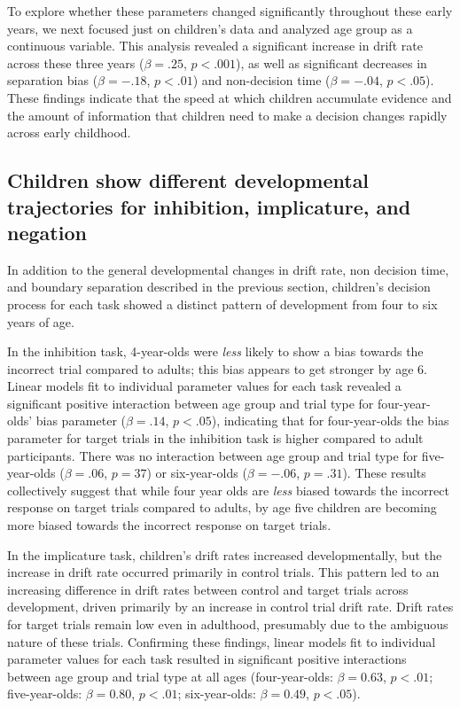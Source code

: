 \documentclass[10pt,letterpaper]{article}
\begin{document}
To explore whether these parameters changed significantly throughout these early years, we next focused just on children's data and analyzed age group as a continuous variable. This analysis revealed a significant increase in drift rate across these three years ($\beta = .25$, $p < .001$), as well as significant decreases in separation bias ($\beta = -.18$, $p < .01$) and non-decision time ($\beta = -.04$, $p < .05$). These findings indicate that the speed at which children accumulate evidence and the amount of information that children need to make a decision changes rapidly across early childhood.

\subsection{Children show different developmental trajectories for inhibition, implicature, and negation}

In addition to the general developmental changes in drift rate, non decision time, and boundary separation described in the previous section, children's decision process for each task showed a distinct pattern of development from four to six years of age.

In the inhibition task, 4-year-olds were \emph{less} likely to show a bias towards the incorrect trial compared to adults; this bias appears to get stronger by age 6. Linear models fit to individual parameter values for each task revealed a significant positive interaction between age group and trial type for four-year-olds' bias parameter ($\beta = .14$, $p< .05$), indicating that for four-year-olds the bias parameter for target trials in the inhibition task is higher compared to adult participants. There was no interaction between age group and trial type for five-year-olds ($\beta = .06$, $p = 37$) or six-year-olds ($\beta = -.06$, $p = .31$). These results collectively suggest that while four year olds are \emph{less} biased towards the incorrect response on target trials compared to adults, by age five children are becoming more biased towards the incorrect response on target trials.

In the implicature task, children's drift rates increased developmentally, but the increase in drift rate occurred primarily in control trials. This pattern led to an increasing difference in drift rates between control and target trials across development, driven primarily by an increase in control trial drift rate. Drift rates for target trials remain low even in adulthood, presumably due to the ambiguous nature of these trials. Confirming these findings, linear models fit to individual parameter values for each task resulted in significant positive interactions between age group and trial type at all ages (four-year-olds: $\beta = 0.63$, $p <.01$; five-year-olds: $\beta = 0.80$, $p <.01$; six-year-olds: $\beta = 0.49$, $p <.05$).
\end{document}
